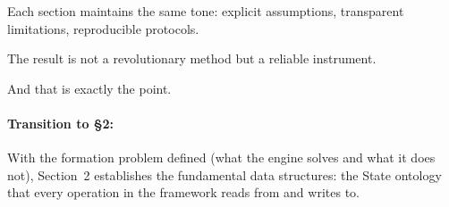 \documentclass[11pt]{article}
\begin{document}
Each section maintains the same tone: explicit assumptions, transparent limitations, reproducible protocols.

The result is not a revolutionary method but a reliable instrument.

And that is exactly the point.

\paragraph{Transition to \S2:} With the formation problem defined (what the engine solves and what it does not), Section~2 establishes the fundamental data structures: the State ontology that every operation in the framework reads from and writes to.
\end{document}
